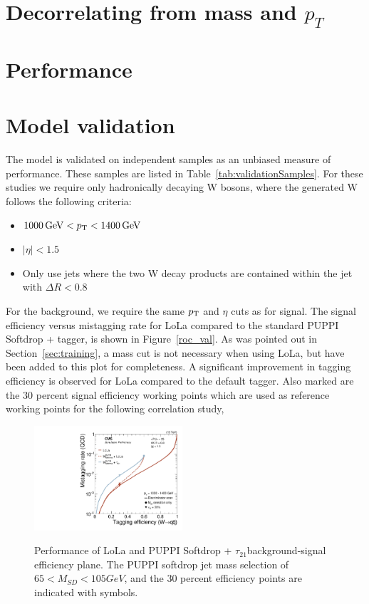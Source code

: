 \section{Decorrelating from mass and $p_{T}$}
\section{Performance}
\section{Model validation}
\label{sec:validation}

The model is validated on independent samples as an unbiased measure of performance. These samples are listed in Table~\ref{tab:validationSamples}.
For these studies we require only hadronically decaying W bosons, where the generated W follows the following criteria:
\begin{itemize}
\item $ 1000 \,\text{Ge\hspace{-.08em}V} < p_{\mathrm{T}} < 1400 \,\text{Ge\hspace{-.08em}V}$
\item $|\eta| < 1.5$
\item Only use jets where the two W decay products are contained within the jet with $\Delta R < 0.8$
\end{itemize}
For the background, we require the same $p_{\mathrm{T}}$ and $\eta$ cuts as for signal. The signal efficiency versus mistagging rate for LoLa compared to
the standard PUPPI Softdrop + \nsubj tagger, is shown in Figure~\ref{roc_val}. As was pointed out in Section~\ref{sec:training}, a mass cut is not necessary when using LoLa, but have been added to this plot for completeness. A significant improvement in tagging efficiency is observed for LoLa compared to the default tagger. Also marked are the 30 percent signal efficiency working points which are used as reference working points for the following correlation study,


\begin{figure}[htb]
\centering
\includegraphics[width=0.49\textwidth]{figures/vtagging/AN-18-099/validation/roc_ZpWqqvsQCD.pdf}\\

\caption{Performance of LoLa and  PUPPI Softdrop + $\tau_{21}$background-signal efficiency plane. The PUPPI softdrop jet mass
selection of $65 < M_{SD} < 105 GeV$, and the 30 percent efficiency points are indicated with symbols.}
\label{fig:roc_val}
\end{figure}


